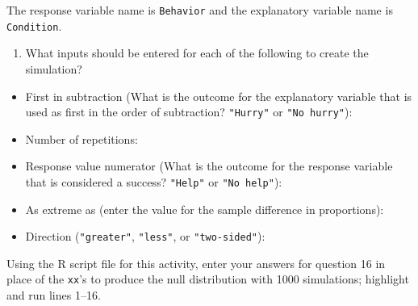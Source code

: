 \documentclass[
]{report}
\providecommand{\tightlist}{%
  \setlength{\itemsep}{0pt}\setlength{\parskip}{0pt}}
\begin{document}
The response variable name is \texttt{Behavior} and the explanatory variable name is \texttt{Condition}.

\begin{enumerate}
\def\labelenumi{\arabic{enumi}.}
\setcounter{enumi}{7}
\tightlist
\item
  What inputs should be entered for each of the following to create the simulation?
  \vspace{1mm}
\end{enumerate}

\begin{itemize}
\tightlist
\item
  First in subtraction (What is the outcome for the explanatory variable that is used as first in the order of subtraction? \texttt{"Hurry"} or \texttt{"No\ hurry"}):
\end{itemize}

\vspace{.15in}

\begin{itemize}
\tightlist
\item
  Number of repetitions:
\end{itemize}

\vspace{.15in}

\begin{itemize}
\tightlist
\item
  Response value numerator (What is the outcome for the response variable that is considered a success? \texttt{"Help"} or \texttt{"No\ help"}):
\end{itemize}

\vspace{.15in}

\begin{itemize}
\tightlist
\item
  As extreme as (enter the value for the sample difference in proportions):
\end{itemize}

\vspace{.15in}

\begin{itemize}
\tightlist
\item
  Direction (\texttt{"greater"}, \texttt{"less"}, or \texttt{"two-sided"}):
\end{itemize}

\vspace{.15in}

Using the R script file for this activity, enter your answers for question 16 in place of the \texttt{xx}'s to produce the null distribution with 1000 simulations; highlight and run lines 1--16.
\end{document}
